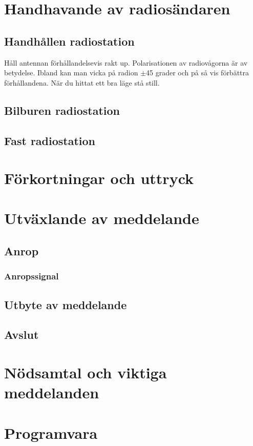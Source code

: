 \section{Handhavande av radiosändaren}

\subsection{Handhållen radiostation}

Håll antennan förhållandelsevis rakt up. Polarisationen av radiovågorna är av betydelse. Ibland kan man vicka på radion $\pm$45 grader och på så vis förbättra förhållandena. När du hittat ett bra läge stå still. 

\subsection{Bilburen radiostation}


\subsection{Fast radiostation}


\section{Förkortningar och uttryck}

\section{Utväxlande av meddelande}

\subsection{Anrop}

\subsubsection{Anropssignal}

\subsection{Utbyte av meddelande}

\subsection{Avslut}

\section{Nödsamtal och viktiga meddelanden}

\section{Programvara}
